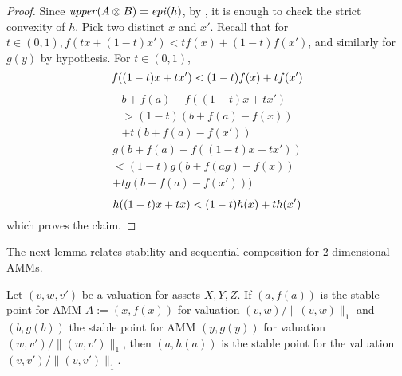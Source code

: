 \begin{proof}
  Since $\mathit{upper}(A \otimes B) = \mathit{epi}(h)$, by , it is enough to check the strict convexity of $h$.
  Pick two distinct $x$ and $x'$.
  Recall that for $t \in (0,1), f(t x + (1-t)x') < t f(x) + (1-t)f(x')$,
  and similarly for $g(y)$ by hypothesis.
  For $t \in (0,1)$,
  \begin{equation*}
    f((1-t)x + t x') \\
    < (1-t)f(x) + t f(x')
  \end{equation*}
  \begin{multline*}
    b+f(a)-f((1-t)x + t x') \\
    > (1-t)(b+f(a)-f(x))\\ + t(b+f(a)-f(x'))
  \end{multline*}
  \begin{multline*}
      g(b+f(a)-f((1-t)x + t x')) \\
      < (1-t)g(b+f(ag)-f(x)) \\+ tg(b+f(a)-f(x')))
  \end{multline*}
  \begin{equation*}
    h((1-t)x + t x) < (1-t)h(x) + t h(x')\\
  \end{equation*}
  which proves the claim.
\end{proof}
The next lemma relates stability and sequential composition
for 2-dimensional AMMs.

\begin{lemma}
  Let $(v,w,v')$ be a valuation for assets $X,Y,Z$.
  If $(a,f(a))$ is the stable point for AMM $A := (x,f(x))$
  for valuation $(v,w)/ \|(v,w)\|_1$
  and $(b,g(b))$ the stable point for AMM $(y,g(y))$
  for valuation $(w,v')/ \|(w,v')\|_1$,
  then $(a,h(a))$ is the stable point for the valuation $(v,v')/\|(v,v')\|_1$.
\end{lemma}

